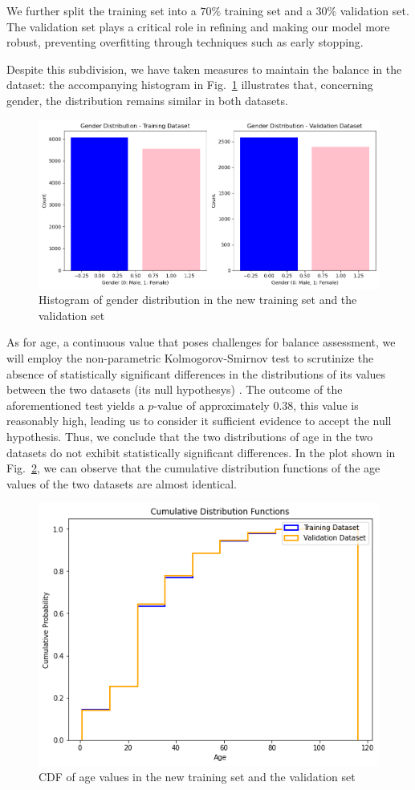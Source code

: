 We further split the training set into a $70\%$ training set and a $30\%$
validation set. The validation set plays a critical role in refining
and making our model more robust, preventing overfitting through techniques
such as early stopping.

Despite this subdivision, we have taken measures to maintain the
balance in the dataset: the accompanying histogram  in Fig.~\ref{3gender2}
illustrates that, concerning gender,
the distribution remains similar in both datasets.

\begin{figure}[htbp]
    \centerline{\includegraphics[width=.5\textwidth]{images/dataset/gender2.png}}
    \caption{Histogram of gender distribution in the new training
    set and the validation set}
    \label{3gender2}
\end{figure}

As for age, a continuous value that poses challenges for balance
assessment, we will employ the non-parametric Kolmogorov-Smirnov test
to scrutinize the absence of statistically significant differences in
the distributions of its values between the two datasets
(its null hypothesys) \cite{app2}.
The outcome of the aforementioned test yields a $p$-value of approximately
$0.38$, this value is reasonably high,
leading us to consider it sufficient evidence to accept the null hypothesis.
Thus, we conclude that the two distributions of age in the two
datasets do not exhibit statistically significant differences.
In the plot shown in Fig.~\ref{4CDFage}, we can observe that
the cumulative distribution functions of the age values of the
two datasets are almost identical.

\begin{figure}[htbp]
    \centerline{\includegraphics[width=.5\textwidth]{images/dataset/CDF_age.png}}
    \caption{CDF of age values in the
    new training set and the validation set}
    \label{4CDFage}
\end{figure}

